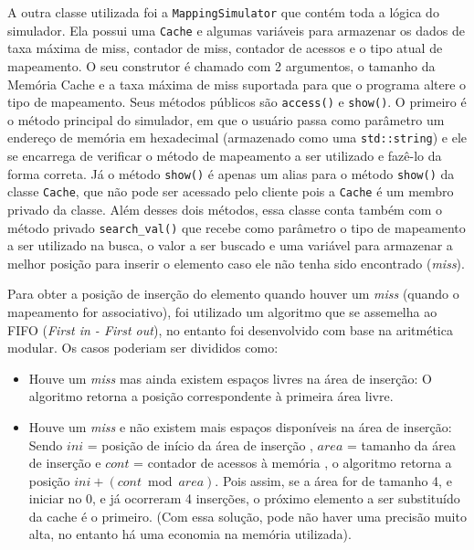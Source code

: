 \documentclass[12pt,openright,oneside,a4paper,english,brazil]{abntex2}
\newcommand{\code}[1]{\colorbox{codegray}{\texttt{#1}}}
\begin{document}
A outra classe utilizada foi a \code{MappingSimulator} que contém toda a lógica do simulador. Ela possui uma \code{Cache} e algumas variáveis para armazenar os dados de taxa máxima de miss, contador de miss, contador de acessos e o tipo atual de mapeamento. O seu construtor é chamado com 2 argumentos, o tamanho da Memória Cache e a taxa máxima de miss suportada para que o programa altere o tipo de mapeamento. Seus métodos públicos são \code{access()} e \code{show()}. O primeiro é o método principal do simulador, em que o usuário passa como parâmetro um endereço de memória em hexadecimal (armazenado como uma \code{std::string}) e ele se encarrega de verificar o método de mapeamento a ser utilizado e fazê-lo da forma correta. Já o método \code{show()} é apenas um alias para o método \code{show()} da classe \code{Cache}, que não pode ser acessado pelo cliente pois a \code{Cache} é um membro privado da classe.
Além desses dois métodos, essa classe conta também com o método privado \code{search\_val()} que recebe como parâmetro o tipo de mapeamento a ser utilizado na busca, o valor a ser buscado e uma variável para armazenar a melhor posição para inserir o elemento caso ele não tenha sido encontrado (\textit{miss}).

Para obter a posição de inserção do elemento quando houver um \textit{miss} (quando o mapeamento for associativo), foi utilizado um algoritmo que se assemelha ao FIFO (\textit{First in - First out}), no entanto foi desenvolvido com base na aritmética modular.
Os casos poderiam ser divididos como:
\begin{itemize}
\item Houve um \textit{miss} mas ainda existem espaços livres na área de inserção: O algoritmo retorna a posição correspondente à primeira área livre.
\item Houve um \textit{miss} e não existem mais espaços disponíveis na área de inserção: Sendo $ ini $ = posição de início da área de inserção , $ area $ = tamanho da área de inserção e $ cont $ = contador de acessos à memória , o algoritmo retorna a posição $ ini + (cont \bmod area) $. Pois assim, se a área for de tamanho 4, e iniciar no 0, e já ocorreram 4 inserções, o próximo elemento a ser substituído da cache é o primeiro. (Com essa solução, pode não haver uma precisão muito alta, no entanto há uma economia na memória utilizada).
\end{itemize}
\end{document}
